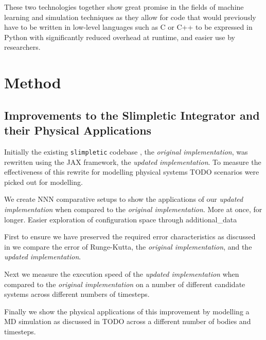 \documentclass[10pt]{iopart}
\def\SI{Slimpletic Integrator}
\begin{document}
These two technologies together show great promise in the fields of machine learning and simulation techniques as they allow for code that would previously have to be written in low-level languages such as C or C++ to be expressed in Python with significantly reduced overhead at runtime, and easier use by researchers.

\section{Method}

\subsection{Improvements to the \SI{} and their Physical Applications}


\newcommand{\orgimpl}{\textit{original implementation}}
\newcommand{\updimpl}{\textit{updated implementation}}

Initially the existing \texttt{slimpletic} codebase \cite{originalCode}, the \orgimpl{}, was rewritten using the JAX framework, the \updimpl{}. To measure the effectiveness of this rewrite for modelling physical systems TODO scenarios were picked out for modelling.

We create NNN comparative setups to show the applications of our \updimpl{} when compared to the \orgimpl{}. More at once, for longer. Easier exploration of configuration space through additional\_data

First to ensure we have preserved the required error characteristics as discussed in  we compare the error of Runge-Kutta, the \orgimpl{}, and the \updimpl{}.

Next we measure the execution speed of the \updimpl{} when compared to the \orgimpl{} on a number of different candidate systems across different numbers of timesteps.

Finally we show the physical applications of this improvement by modelling a MD simulation as discussed in TODO across a different number of bodies and timesteps.

\end{document}

